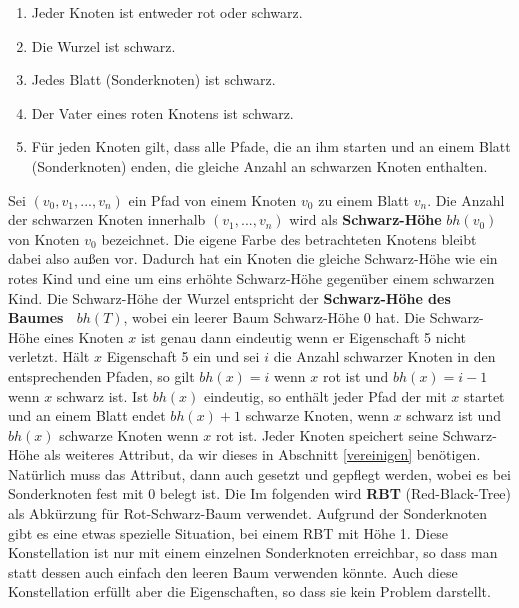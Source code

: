 \documentclass[a4paper,12pt]{article}
\begin{document}
\begin{enumerate}
	\item Jeder Knoten ist entweder rot oder schwarz.
	\item Die Wurzel ist schwarz.
	\item Jedes Blatt (Sonderknoten) ist schwarz.
	\item Der Vater eines roten Knotens ist schwarz.
	\item Für jeden Knoten gilt, dass alle Pfade, die an ihm starten und an einem Blatt (Sonderknoten) enden, die gleiche Anzahl an schwarzen Knoten enthalten. 
\end{enumerate}  
Sei $(v_0,v_1,...,v_n)$ ein Pfad von einem Knoten $v_0$ zu einem Blatt $v_n$. Die Anzahl der schwarzen Knoten innerhalb $(v_1,...,v_n)$ wird als \textbf{Schwarz-Höhe} $\mathit{bh(v_0)}$ von Knoten $v_0$ bezeichnet. Die eigene Farbe des betrachteten Knotens bleibt dabei also außen vor. Dadurch hat ein Knoten die gleiche Schwarz-Höhe wie ein rotes Kind und eine um eins erhöhte Schwarz-Höhe gegenüber einem schwarzen Kind. Die Schwarz-Höhe der Wurzel entspricht der \textbf{Schwarz-Höhe des Baumes~ $bh(T)$}, wobei ein leerer Baum Schwarz-Höhe $0$ hat. Die Schwarz-Höhe eines Knoten $x$ ist genau dann eindeutig wenn er Eigenschaft 5 nicht verletzt. Hält $x$ Eigenschaft 5 ein und sei $i$ die Anzahl schwarzer Knoten in den entsprechenden Pfaden, so gilt $\mathit{bh(x)} = i$ wenn $x$ rot ist und $\mathit{bh(x)} = i - 1$ wenn $x$ schwarz ist. Ist $\mathit{bh(x)}$ eindeutig, so enthält jeder Pfad der mit $x$ startet und an einem Blatt endet $\mathit{bh(x)} + 1$ schwarze Knoten, wenn $x$ schwarz ist und  $\mathit{bh(x)}$ schwarze Knoten wenn $x$ rot ist. Jeder Knoten speichert seine Schwarz-Höhe als weiteres Attribut, da wir dieses in Abschnitt \ref{vereinigen} benötigen. Natürlich muss das Attribut, dann auch gesetzt und gepflegt werden, wobei es bei Sonderknoten fest mit $0$ belegt ist. Die Im folgenden wird \textbf{RBT} (Red-Black-Tree) als Abkürzung für Rot-Schwarz-Baum verwendet. Aufgrund der Sonderknoten gibt es eine etwas spezielle Situation, bei einem RBT mit Höhe 1. Diese Konstellation ist nur mit einem einzelnen Sonderknoten erreichbar, so dass man statt dessen auch einfach den leeren Baum verwenden könnte. Auch diese Konstellation erfüllt aber die Eigenschaften, so dass sie kein Problem darstellt. \\
\end{document}
